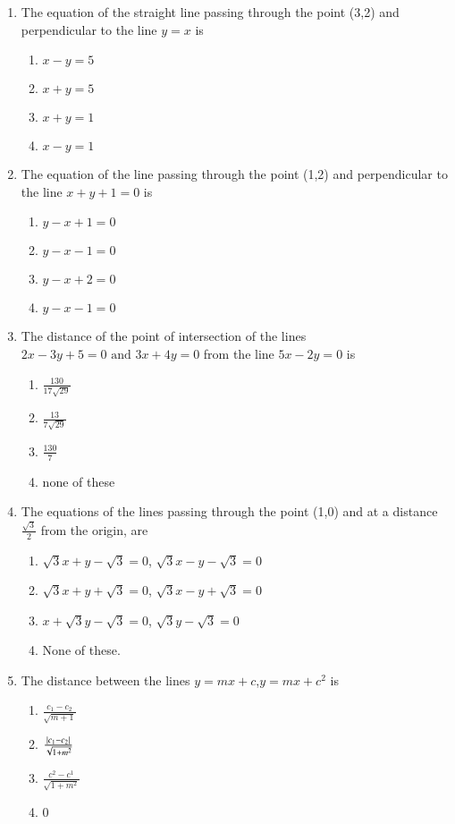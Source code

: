 \begin{enumerate}[label=\thesubsection.\arabic*,ref=\thesubsection.\theenumi]
\item The equation of the straight line passing through the point (3,2) and perpendicular to the line $y=x$ is
\begin{enumerate}
\item $x-y=5$
\item $x+y=5$
\item $x+y=1$
\item $x-y=1$
\end{enumerate}
\item The equation of the line passing through the point (1,2) and perpendicular to the line $x+y+1=0$ is
\begin {enumerate}
\item $y-x+1=0$
\item $y-x-1=0$
\item $y-x+2=0$
\item $y-x-1=0$
\end{enumerate}
\item The distance of the point of intersection of the lines $2x-3y+5=0 \text{ and }3x+4y=0$ from the line $5x-2y=0$ is
\begin{enumerate}
\item $\frac{130}{17\sqrt{29}}$
\item $\frac{13}{7\sqrt{29}}$
\item $\frac{130}{7}$
\item none of these
\end{enumerate}
\item The equations of the lines passing through the point (1,0) and at a distance $\frac{\sqrt{3}}{2}$ from the origin, are 
\begin{enumerate}
\item $\sqrt{3}x+y-\sqrt{3}=0$, $\sqrt{3}x-y-\sqrt{3}=0$
\item $\sqrt{3}x+y+\sqrt{3}=0$, $\sqrt{3}x-y+\sqrt{3}=0$
\item $x+\sqrt{3}y-\sqrt{3}=0$, $\sqrt{3}y-\sqrt{3}=0$
\item None of these.
\end{enumerate}
\item The distance between the lines $y=mx+c$,$y=mx+c^2$ is
\begin{enumerate}
\item $\frac{c_1-c_2}{\sqrt{m+1}}$
\item $\frac{\left\vert c_1-c_2\right\vert}{\sqrt{1+m^2}}$
\item $\frac{c^2-c^1}{\sqrt{1+m^2}}$
\item 0
\end{enumerate}

\end{enumerate}
